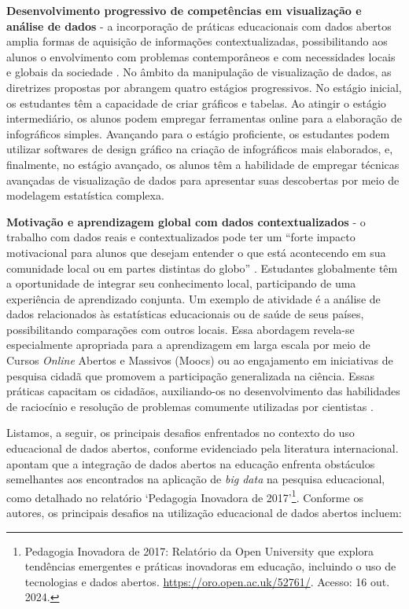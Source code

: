 \documentclass[portuguese]{textolivre}
\begin{document}
\textbf{Desenvolvimento progressivo de competências em visualização e análise de dados} - a incorporação de práticas educacionais com dados abertos amplia formas de aquisição de informações contextualizadas, possibilitando aos alunos o envolvimento com problemas contemporâneos e com necessidades locais e globais da sociedade \cite{atenas2015,coughlan2019}. No âmbito da manipulação de visualização de dados, as diretrizes propostas por \textcite{atenas2015} abrangem quatro estágios progressivos. No estágio inicial, os estudantes têm a capacidade de criar gráficos e tabelas. Ao atingir o estágio intermediário, os alunos podem empregar ferramentas online para a elaboração de infográficos simples. Avançando para o estágio proficiente, os estudantes podem utilizar softwares de design gráfico na criação de infográficos mais elaborados, e, finalmente, no estágio avançado, os alunos têm a habilidade de empregar técnicas avançadas de visualização de dados para apresentar suas descobertas por meio de modelagem estatística complexa.

\textbf{Motivação e aprendizagem global com dados contextualizados} - o trabalho com dados reais e contextualizados pode ter um “forte impacto motivacional para alunos que desejam entender o que está acontecendo em sua comunidade local ou em partes distintas do globo” \cite[p.~19, tradução nossa]{kukulska-hulme2020}. Estudantes globalmente têm a oportunidade de integrar seu conhecimento local, participando de uma experiência de aprendizado conjunta. Um exemplo de atividade é a análise de dados relacionados às estatísticas educacionais ou de saúde de seus países, possibilitando comparações com outros locais. Essa abordagem revela-se especialmente apropriada para a aprendizagem em larga escala por meio de Cursos \textit{Online} Abertos e Massivos (Moocs) ou ao engajamento em iniciativas de pesquisa cidadã que promovem a participação generalizada na ciência. Essas práticas capacitam os cidadãos, auxiliando-os no desenvolvimento das habilidades de raciocínio e resolução de problemas comumente utilizadas por cientistas \cite{kukulska-hulme2020}.

Listamos, a seguir, os principais desafios enfrentados no contexto do uso educacional de dados abertos, conforme evidenciado pela literatura internacional. \textcite{kukulska-hulme2020} apontam que a integração de dados abertos na educação enfrenta obstáculos semelhantes aos encontrados na aplicação de \textit{big data} na pesquisa educacional, como detalhado no relatório ‘Pedagogia Inovadora de 2017’\footnote{Pedagogia Inovadora de 2017: Relatório da Open University que explora tendências emergentes e práticas inovadoras em educação, incluindo o uso de tecnologias e dados abertos. \url{https://oro.open.ac.uk/52761/}. Acesso: 16 out. 2024.}. Conforme os autores, os principais desafios na utilização educacional de dados abertos incluem:
\end{document}
